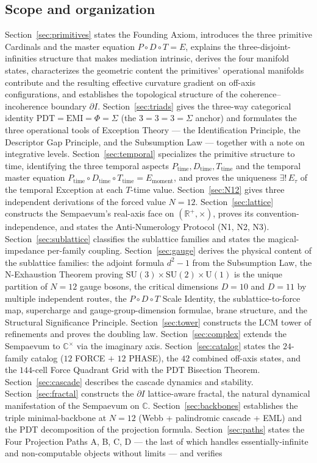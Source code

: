\documentclass[11pt,a4paper]{article}
\theoremstyle{definition}
\theoremstyle{remark}
\newcommand{\R}{\mathbb{R}}
\newcommand{\C}{\mathbb{C}}
\begin{document}
\subsection{Scope and organization}

Section~\ref{sec:primitives} states the Founding Axiom, introduces the three primitive Cardinals and the master equation $P\circ D\circ T = E$, explains the three-disjoint-infinities structure that makes mediation intrinsic, derives the four manifold states, characterizes the geometric content the primitives' operational manifolds contribute and the resulting effective curvature gradient on off-axis configurations, and establishes the topological structure of the coherence--incoherence boundary $\partial I$. Section~\ref{sec:triads} gives the three-way categorical identity $\mathrm{PDT} = \mathrm{EMI} = \Phi = \Sigma$ (the $3=3=3=\Sigma$ anchor) and formulates the three operational tools of Exception Theory --- the Identification Principle, the Descriptor Gap Principle, and the Subsumption Law --- together with a note on integrative levels. Section~\ref{sec:temporal} specializes the primitive structure to time, identifying the three temporal aspects $P_{\text{time}}, D_{\text{time}}, T_{\text{time}}$ and the temporal master equation $P_{\text{time}} \circ D_{\text{time}} \circ T_{\text{time}} = E_{\text{moment}}$, and proves the uniqueness $\exists!\,E_{\tau}$ of the temporal Exception at each $T$-time value. Section~\ref{sec:N12} gives three independent derivations of the forced value $N=12$. Section~\ref{sec:lattice} constructs the Sempaevum's real-axis face on $(\R^{+},\times)$, proves its convention-independence, and states the Anti-Numerology Protocol (N1, N2, N3). Section~\ref{sec:sublattice} classifies the sublattice families and states the magical-impedance per-family coupling. Section~\ref{sec:gauge} derives the physical content of the sublattice families: the adjoint formula $d^{2}-1$ from the Subsumption Law, the N-Exhaustion Theorem proving $\mathrm{SU}(3)\times\mathrm{SU}(2)\times\mathrm{U}(1)$ is the unique partition of $N=12$ gauge bosons, the critical dimensions $D=10$ and $D=11$ by multiple independent routes, the $P{\circ}D{\circ}T$ Scale Identity, the sublattice-to-force map, supercharge and gauge-group-dimension formulae, brane structure, and the Structural Significance Principle. Section~\ref{sec:tower} constructs the LCM tower of refinements and proves the doubling law. Section~\ref{sec:complex} extends the Sempaevum to $\C^{\times}$ via the imaginary axis. Section~\ref{sec:catalog} states the $24$-family catalog ($12$ FORCE $+$ $12$ PHASE), the $42$ combined off-axis states, and the $144$-cell Force Quadrant Grid with the PDT Bisection Theorem. Section~\ref{sec:cascade} describes the cascade dynamics and stability. Section~\ref{sec:fractal} constructs the $\partial I$ lattice-aware fractal, the natural dynamical manifestation of the Sempaevum on $\C$. Section~\ref{sec:backbones} establishes the triple minimal-backbone at $N=12$ (Webb + palindromic cascade + EML) and the PDT decomposition of the projection formula. Section~\ref{sec:paths} states the Four Projection Paths A, B, C, D --- the last of which handles essentially-infinite and non-computable objects without limits --- and verifies 
\end{document}
